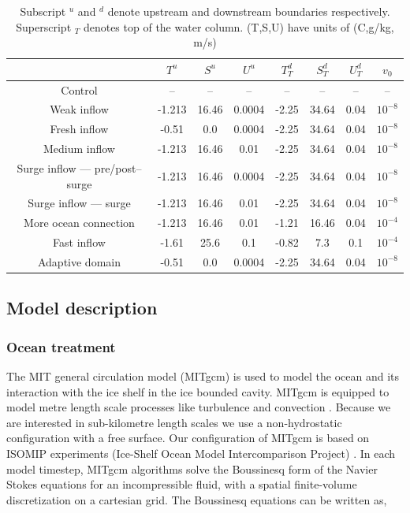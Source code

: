\begin{table}[!ht]
\begin{tabular}{|c|c|c|c|c|c|c|c|}
    \hline
    & $T^{u}$ & $S^{u} $ & $U^{u}$& $T^d_T$ & $S^d_T$ & $U^d_T$ & $v_0$ \\
     \hline
    Control & -- & -- & --& -- &--  &--  &--  \\
    Weak inflow & -1.213 & 16.46  &0.0004 &  -2.25 & 34.64 & 0.04 & $10^{-8}$  \\
    Fresh inflow & -0.51 & 0.0 &0.0004 &  -2.25 & 34.64 & 0.04 & $10^{-8}$  \\
    Medium inflow & -1.213 & 16.46 & 0.01 &  -2.25 & 34.64 & 0.04  & $10^{-8}$ \\
    Surge inflow --- pre/post--surge  & -1.213 & 16.46  &0.0004 &  -2.25 & 34.64 & 0.04 & $10^{-8}$ \\
    Surge inflow --- surge & -1.213 & 16.46 & 0.01 &  -2.25 & 34.64 & 0.04  & $10^{-8}$ \\
    More ocean connection & -1.213 & 16.46 & 0.01 &  -1.21 & 16.46 & 0.04& $10^{-4}$  \\
    Fast inflow & -1.61 & 25.6 & 0.1 & -0.82 & 7.3  & 0.1 & $10^{-4}$ \\
    \hline
    Adaptive domain  & -0.51 & 0.0 &0.0004 &  -2.25 & 34.64 & 0.04 & $10^{-8}$ \\
    \hline
\end{tabular}
\caption[Model run parameters]{\label{tab:model_runs} Subscript $^u$ and $^d$ denote upstream and downstream boundaries respectively. Superscript $_T$ denotes top of the water column. (T,S,U) have units of (\textdegree C,g/kg, m/s)  }
\end{table}

\subsection{Model description}
\subsubsection{Ocean treatment} \label{sec:ocean_treatment}

The MIT general circulation model (MITgcm) \citep{marshall1997finite,marshall1997hydrostatic} is used to model the ocean and its interaction with the ice shelf in the ice bounded cavity. MITgcm is equipped to model metre length scale processes like turbulence and convection \citep[e.g.]{xu2012numerical}.
Because we are interested in sub-kilometre length scales we use a non-hydrostatic configuration with a free surface. Our configuration of MITgcm is based on ISOMIP experiments (Ice-Shelf Ocean Model Intercomparison Project) \citep{holland2003ice}.  In each model timestep, MITgcm algorithms solve the Boussinesq form of the Navier Stokes equations for an incompressible fluid, with a spatial finite-volume discretization on a cartesian grid.
The Boussinesq equations can be written as,


